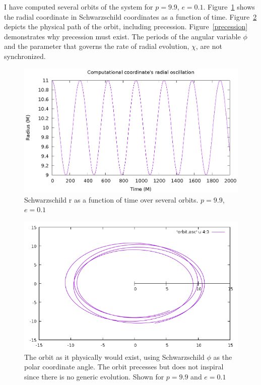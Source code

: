 I have computed several orbits of the system for $p=9.9$, $e=0.1$. Figure~\ref{rorb} shows the radial coordinate in Schwarzschild coordinates as a function of time. Figure~\ref{phiorb} depicts the physical path of the orbit, including precession. Figure~\ref{precession} demonstrates why precession must exist. The periods of the angular variable $\phi$ and the parameter that governs the rate of radial evolution, $\chi$, are not synchronized.

\begin{figure}
  \includegraphics{orbit}
  \caption{Schwarzschild r as a function of time over several orbits. $p=9.9$, $e=0.1$}
  \label{rorb}
\end{figure}


\begin{figure}
  \includegraphics{orbitevolvedg44p99e01}
  \caption{The orbit as it physically would exist, using Schwarzschild $\phi$ as the polar coordinate angle. The orbit precesses but does not inspiral since there is no generic evolution. Shown for $p=9.9$ and $e=0.1$}
  \label{phiorb}
\end{figure}


